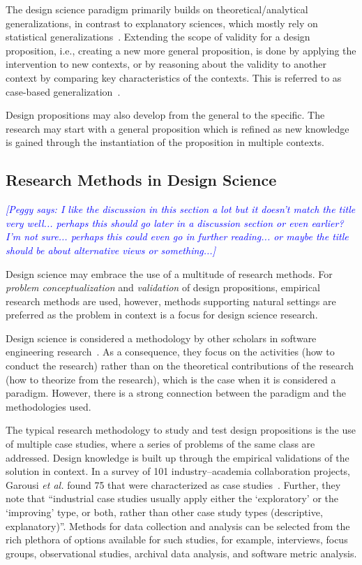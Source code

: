\documentclass[graybox]{svmult}
\newcommand{\peggy}[1]{\textcolor{blue}{{\it [Peggy says: #1]}}}
\newcommand{\peggy}[1]{}
\begin{document}
The design science paradigm primarily builds on theoretical/analytical generalizations, in contrast to explanatory sciences, which mostly rely on statistical generalizations~\cite[p. 30]{Runeson12Case}. Extending the scope of validity for a design proposition, i.e., creating a new more general proposition, is done by applying the intervention to new contexts, or by reasoning about the validity to another context by comparing key characteristics of the contexts. This is referred to as case-based generalization~\cite{wieringa_six_2015}.  

Design propositions may also develop from the general to the specific. The research may start with a general proposition which is refined as new knowledge is gained through the instantiation of the proposition in multiple contexts. 


\subsection{Research Methods in Design Science} 
\peggy{I like the discussion in this section a lot but it doesn't match the title very well...  perhaps this should go later in a discussion section or even earlier? I'm not sure... perhaps this could even go in further reading... or maybe the title should be about alternative views or something...}

Design science may embrace the use of a multitude of research methods. For \emph{problem conceptualization} and \emph{validation} of design propositions, empirical research methods are used, however, methods supporting natural settings are preferred as the problem in context is a focus for design science research. 

Design science is considered a methodology by other scholars in software engineering research~\cite{Wohlin2015}. As a consequence, they focus on the %
activities (how to conduct the research) rather than on the theoretical contributions of the research (how to theorize from the research), which is the case when it is considered a paradigm. However, %
there is a strong connection between the paradigm and the methodologies used.%


The typical research methodology to study and test design propositions is the use of multiple case studies, where a series of problems of the same class are addressed. Design knowledge is built up through the empirical validations of the solution in context. 
In a survey of 101 industry--academia collaboration projects, Garousi \emph{et al.} found 75 that were characterized as case studies~\cite{Garousi2019}. Further, they note that ``industrial case studies usually apply either the `exploratory' or the `improving' type, or both, rather than other case study types (descriptive, explanatory)''. Methods for data collection and analysis can be selected from the rich plethora of options available for such studies, for example, interviews, focus groups, observational studies, archival data analysis, and software metric analysis. 
\end{document}
